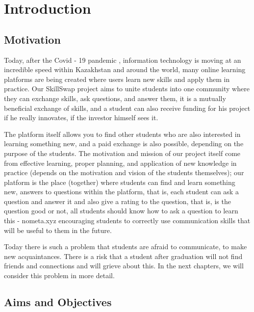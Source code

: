 \chapter{Introduction}\label{ch:intro}

\section{Motivation}\label{motivation}
Today, after the Covid - 19 pandemic \cite{covid}, information technology is moving at an incredible speed within Kazakhstan and around the world, many online learning platforms are being created where users learn new skills and apply them in practice. Our SkillSwap \cite{skillswap} project aims to unite students into one community where they can exchange skills, ask questions, and answer them, it is a mutually beneficial exchange of skills, and a student can also receive funding for his project if he really innovates, if the investor himself sees it.
\par
\vspace{0.5cm} 
The platform itself allows you to find other students who are also interested in learning something new, and a paid exchange is also possible, depending on the purpose of the students. The motivation and mission of our project itself come from effective learning, proper planning, and application of new knowledge in practice (depends on the motivation and vision of the students themselves); our platform is the place (together) where students can find and learn something new, answers to questions within the platform, that is, each student can ask a question and answer it and also give a rating to the question, that is, is the question good or not, all students should know how to ask a question to learn this -  nometa.xyz \cite{nometa} encouraging students to correctly use communication skills that will be useful to them in the future. 
\par
\vspace{0.5cm} 
Today there is such a problem that students are afraid to communicate, to make new acquaintances. There is a risk that a student after graduation will not find friends and connections and will grieve about this. In the next chapters, we will consider this problem in more detail.

\newpage
\section{Aims and Objectives}\label{aimsobj}

